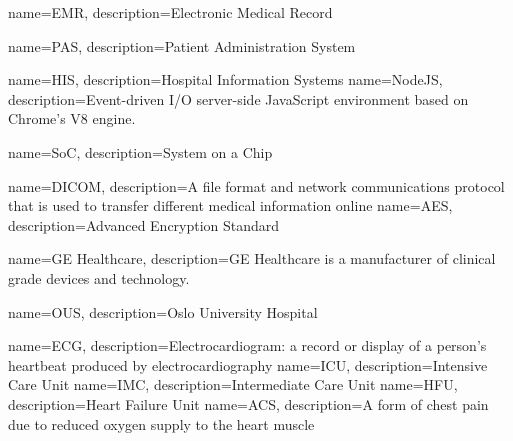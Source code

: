 {
    name=EMR,
    description={Electronic Medical Record}
}

{
    name=PAS,
    description={Patient Administration System}
}

{
    name=HIS,
    description={Hospital Information Systems}
}
{
    name=NodeJS,
    description={Event-driven I/O server-side JavaScript environment based on Chrome's V8 engine.}
}

{
    name=SoC,
    description={System on a Chip}
}

{
    name=DICOM,
    description={A file format and network communications protocol that is used to transfer different medical information online}
}
{
    name=AES,
    description={Advanced Encryption Standard}
}

{
    name=GE Healthcare,
    description={GE Healthcare is a manufacturer of clinical grade devices and technology.}
}

{
    name=OUS,
    description={Oslo University Hospital}
}

{
    name=ECG,
    description={Electrocardiogram: a record or display of a person's heartbeat produced by electrocardiography}
}
{
    name=ICU,
    description={Intensive Care Unit}
}
{
    name=IMC,
    description={Intermediate Care Unit}
}
{
    name=HFU,
    description={Heart Failure Unit}
}
{
    name=ACS,
    description={A form of chest pain due to reduced oxygen supply to the heart muscle}
}